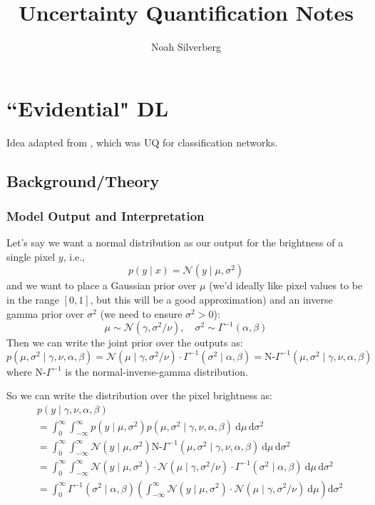 \documentclass{article}
\title{Uncertainty Quantification Notes}
\author{Noah Silverberg}
\date{}
\newcommand{\0}{\varnothing}
\theoremstyle{definition}
\renewcommand{\d}{\mathrm{d}}
\begin{document}
\maketitle

\section{``Evidential" DL}

Idea adapted from \cite{sensoy2018evidentialdeeplearningquantify}, which was UQ for classification networks.

\subsection{Background/Theory}

\subsubsection{Model Output and Interpretation}

Let's say we want a normal distribution as our output for the brightness of a single pixel $y$, i.e.,
$$p(y \mid x) = \mathcal{N}(y \mid \mu, \sigma^2)$$
and we want to place a Gaussian prior over $\mu$ (we'd ideally like pixel values to be in the range $[0, 1]$, but this will be a good approximation) and an inverse gamma prior over $\sigma^2$ (we need to ensure $\sigma^2 > 0$):
$$\mu \sim \mathcal{N}(\gamma, \sigma^2/\nu), \quad \sigma^2 \sim \Gamma^{-1}(\alpha, \beta)$$
Then we can write the joint prior over the outputs as:
$$p(\mu, \sigma^2 \mid \gamma, \nu, \alpha, \beta) = \mathcal{N}(\mu \mid \gamma, \sigma^2/\nu) \cdot \Gamma^{-1}(\sigma^2 \mid \alpha, \beta)= \text{N-}\Gamma^{-1}(\mu, \sigma^2 \mid \gamma, \nu, \alpha, \beta)$$
where $\text{N-}\Gamma^{-1}$ is the normal-inverse-gamma distribution.

So we can write the distribution over the pixel brightness as:
\begin{align*}
    &p(y \mid \gamma, \nu, \alpha, \beta) \\
    &= \int_0^\infty \int_{-\infty}^\infty p(y \mid \mu, \sigma^2) p(\mu, \sigma^2 \mid \gamma, \nu, \alpha, \beta)\ \d\mu\,\d\sigma^2 \\
    &= \int_0^\infty \int_{-\infty}^\infty \mathcal{N}(y \mid \mu, \sigma^2) \text{N-}\Gamma^{-1}(\mu, \sigma^2 \mid \gamma, \nu, \alpha, \beta)\ \d\mu\,\d\sigma^2 \\
    &= \int_0^\infty \int_{-\infty}^\infty \mathcal{N}(y \mid \mu, \sigma^2) \cdot \mathcal{N}(\mu \mid \gamma, \sigma^2/\nu) \cdot \Gamma^{-1}(\sigma^2 \mid \alpha, \beta)\ \d\mu\,\d\sigma^2 \\
    &= \int_0^\infty \Gamma^{-1}(\sigma^2 \mid \alpha, \beta) \left( \int_{-\infty}^\infty \mathcal{N}(y \mid \mu, \sigma^2) \cdot \mathcal{N}(\mu \mid \gamma, \sigma^2/\nu)\ \d\mu \right) \d\sigma^2
\end{align*}
\end{document}
